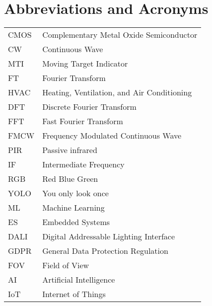 \chapter*{Abbreviations and Acronyms}


\noindent
\begin{longtable}{@{}p{}p{}@{}}

CMOS & Complementary Metal Oxide Semiconductor\\
CW & Continuous Wave\\
MTI & Moving Target Indicator \\
FT & Fourier Transform\\
HVAC & Heating, Ventilation, and Air Conditioning\\
DFT & Discrete Fourier Transform\\

FFT & Fast Fourier Transform \\ 
FMCW & Frequency Modulated Continuous Wave \\
PIR & Passive infrared \\ 
IF & Intermediate Frequency \\
RGB & Red Blue Green \\
YOLO & You only look once\\
ML & Machine Learning \\
ES & Embedded Systems \\
DALI & Digital Addressable Lighting Interface\\
GDPR & General Data Protection Regulation \\
FOV & Field of View\\
AI & Artificial Intelligence\\
IoT & Internet of Things\\



\end{longtable}
